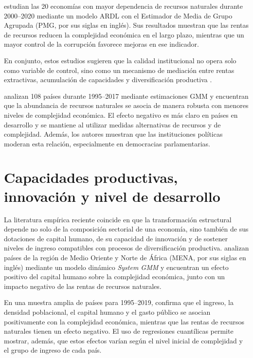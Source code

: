 \documentclass[../../TFM.tex]{subfiles}
\begin{document}
	\textcite{Owjimehr2024} estudian las 20 economías con mayor dependencia de recursos naturales durante 2000--2020 mediante un modelo ARDL con el Estimador de Media de Grupo Agrupada (PMG, por sus siglas en inglés). Sus resultados muestran que las rentas de recursos reducen la complejidad económica en el largo plazo, mientras que un mayor control de la corrupción favorece mejoras en ese indicador.

	En conjunto, estos estudios sugieren que la calidad institucional no opera solo como variable de control, sino como un mecanismo de mediación entre rentas extractivas, acumulación de capacidades y diversificación productiva \parencite{Ajide2022,Olaniyi-Odhiambo2025-3,Olaniyi-Odhiambo2025}.

	\textcite{Avom2022} analizan 108 países durante 1995--2017 mediante estimaciones GMM y encuentran que la abundancia de recursos naturales se asocia de manera robusta con menores niveles de complejidad económica. El efecto negativo es más claro en países en desarrollo y se mantiene al utilizar medidas alternativas de recursos y de complejidad. Además, los autores muestran que las instituciones políticas moderan esta relación, especialmente en democracias parlamentarias.

	\section{Capacidades productivas, innovación y nivel de desarrollo}
	\label{sec:capacidades-innovacion-desarrollo}
	
	La literatura empírica reciente coincide en que la transformación estructural depende no solo de la composición sectorial de una economía, sino también de sus dotaciones de capital humano, de su capacidad de innovación y de sostener niveles de ingreso compatibles con procesos de diversificación productiva. \textcite{YaseminYalta2021} analizan países de la región de Medio Oriente y Norte de África (MENA, por sus siglas en inglés) mediante un modelo dinámico \textit{System GMM} y encuentran un efecto positivo del capital humano sobre la complejidad económica, junto con un impacto negativo de las rentas de recursos naturales.

	En una muestra amplia de países para 1995--2019, \textcite{Chu2023} confirma que el ingreso, la densidad poblacional, el capital humano y el gasto público se asocian positivamente con la complejidad económica, mientras que las rentas de recursos naturales tienen un efecto negativo. El uso de regresiones cuantílicas permite mostrar, además, que estos efectos varían según el nivel inicial de complejidad y el grupo de ingreso de cada país.
\end{document}
